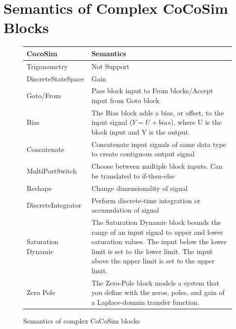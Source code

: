 \documentclass{article}
\begin{document}
\section{Semantics of Complex CoCoSim Blocks}

\begin{figure}[t]
\centering
{
\begin{tabular}{lp{5cm}}
\hline
\textbf{CocoSim} & \textbf{Semantics}  \\
\hline

Trigonometry &
Not Support
\\

DiscreteStateSpace &
Gain
\\

Goto/From &
Pass block input to From blocks/Accept input from Goto block
\\

Bias &
The Bias block adds a bias, or offset, to the input signal ($Y = U + bias$), where U is the block input and Y is the output.
\\

Concatenate &
Concatenate input signals of same data type to create contiguous output signal
\\

MultiPortSwitch &
Choose between multiple block inputs. Can be translated to if-then-else
\\

Reshape &
Change dimensionality of signal
\\

DiscreteIntegrator &
Perform discrete-time integration or accumulation of signal
\\

Saturation Dynamic &
The Saturation Dynamic block bounds the range of an input signal to upper and lower saturation values. The input below the lower limit is set to the lower limit. The input above the upper limit is set to the upper limit.
\\

Zero Pole &
The Zero-Pole block models a system that you define with the zeros, poles, and gain of a Laplace-domain transfer function. 
\\

\hline
\end{tabular}
}
\caption{Semantics of complex CoCoSim blocks}
\label{mapping2}
\end{figure}
\end{document}
